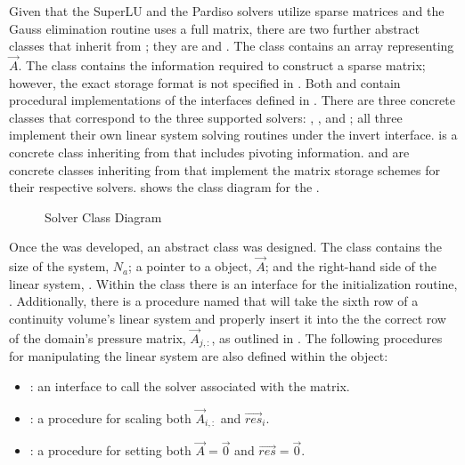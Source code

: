 Given that the SuperLU and the Pardiso solvers utilize sparse matrices and the Gauss elimination routine uses a full matrix, there are two further abstract classes that inherit from ; they are  and .
The  class contains an array representing $\vec{A}$.
The  class contains the information required to construct a sparse matrix; however, the exact storage format is not specified in .
Both  and  contain procedural implementations of the interfaces defined in .
There are three concrete classes that correspond to the three supported solvers: , , and ; all three implement their own linear system solving routines under the invert interface.
 is a concrete class inheriting from  that includes pivoting information.
 and  are concrete classes inheriting from  that implement the matrix storage schemes for their respective solvers.
 shows the class diagram for the  .

\begin{figure}[ht!]
\singlespace\centering

\caption{Solver Class Diagram}
\label{fig:solverClassDiagram}
\end{figure}

Once the   was developed, an abstract  class was designed.
The  class contains the size of the system, $N_{a}$; a pointer to a  object, $\vec{A}$; and the right-hand side of the linear system, .
Within the  class there is an interface for the initialization routine, .
Additionally, there is a procedure named  that will take the sixth row of a continuity volume's linear system and properly insert it into the the correct row of the domain's pressure matrix, $\vec{A}_{j,:}$, as outlined in .
The following procedures for manipulating the linear system are also defined within the  object:

\begin{itemize}
\item{  : an interface to call the solver associated with the matrix.}
\item{  : a procedure for scaling both $\vec{A}_{i, :}$ and $\vec{res}_{i}$.}
\item{  : a procedure for setting both $\vec{A} = \vec{0}$ and $\vec{res} = \vec{0}$.}
\end{itemize}

